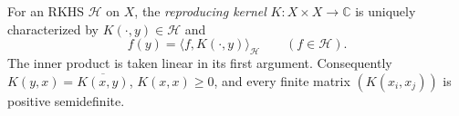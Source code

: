 
For an RKHS $\mathcal H$ on $X$, the \emph{reproducing kernel} $K:X\times X\to\mathbb C$ is uniquely characterized by $K(\cdot,y)\in\mathcal H$ and
\[
f(y)=\langle f,K(\cdot,y)\rangle_{\mathcal H}\qquad(f\in\mathcal H).
\]
The inner product is taken linear in its first argument. Consequently $K(y,x)=\overline{K(x,y)}$, $K(x,x)\ge0$, and every finite matrix $(K(x_i,x_j))$ is positive semidefinite.
